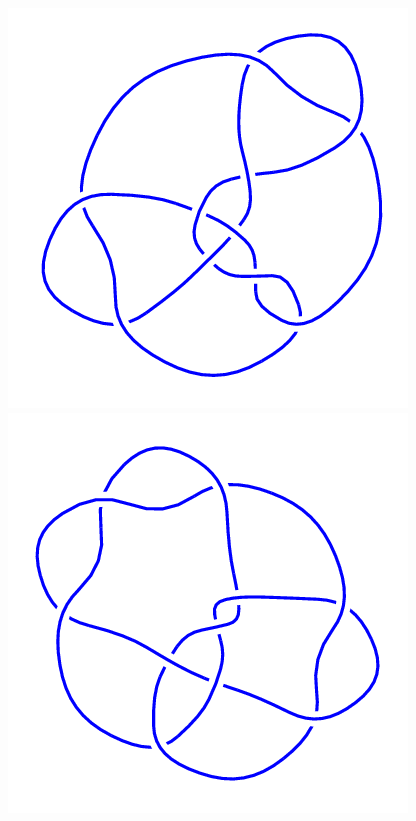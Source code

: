 \begin{figure}[H]
	\begin{minipage}[b]{.18\linewidth}
		\centering
		\includegraphics[width=\linewidth]{../data/10_107.png}
	\end{minipage}
	\begin{minipage}[b]{.18\linewidth}
		\centering
		\includegraphics[width=\linewidth]{../data/10_108.png}

\end{minipage}
\end{figure}
